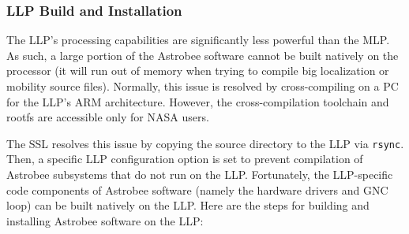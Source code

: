\documentclass{article}
\begin{document}
\subsubsection{LLP Build and Installation}
The LLP's processing capabilities are significantly less powerful than the MLP. As such, a large portion of the Astrobee software cannot be built natively on the processor (it will run out of memory when trying to compile big localization or mobility source files). Normally, this issue is resolved by cross-compiling on a PC for the LLP's ARM architecture. However, the cross-compilation toolchain and rootfs are accessible only for NASA users. 

The SSL resolves this issue by copying the source directory to the LLP via \texttt{rsync}. Then, a specific LLP configuration option is set to prevent compilation of Astrobee subsystems that do not run on the LLP. Fortunately, the LLP-specific code components of Astrobee software (namely the hardware drivers and GNC loop) can be built natively on the LLP. Here are the steps for building and installing Astrobee software on the LLP:
\end{document}
